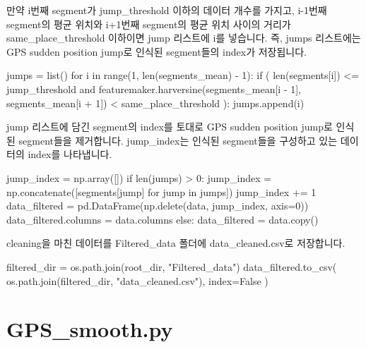 \documentclass{oblivoir}
\begin{document}
  만약 i번째 segment가 jump\_threshold 이하의 데이터 개수를 가지고, i-1번째 segment의 평균 위치와 i+1번째 segment의 평균 위치 사이의 거리가 same\_place\_threshold 이하이면 jump 리스트에 i를 넣습니다.
  즉, jumps 리스트에는 GPS sudden position jump로 인식된 segment들의 index가 저장됩니다.
  \begin{python}[label={GPS_clean_7}]
    jumps = list()
    for i in range(1, len(segments_mean) - 1):
        if (
            len(segments[i]) <= jump_threshold
            and featuremaker.harversine(segments_mean[i - 1], segments_mean[i + 1])
            < same_place_threshold
        ):
            jumps.append(i)
  \end{python}
  jump 리스트에 담긴 segment의 index를 토대로 GPS sudden position jump로 인식된 segment들을 제거합니다.
  jump\_index는 인식된 segment들을 구성하고 있는 데이터의 index를 나타냅니다.
  \begin{python}[label={GPS_clean_8}]
    jump_index = np.array([])
    if len(jumps) > 0:
        jump_index = np.concatenate([segments[jump] for jump in jumps])
        jump_index += 1
        data_filtered = pd.DataFrame(np.delete(data, jump_index, axis=0))
        data_filtered.columns = data.columns
    else:
        data_filtered = data.copy()
  \end{python}
  cleaning을 마친 데이터를 Filtered\_data 폴더에 data\_cleaned.csv로 저장합니다.
  \begin{python}[label={GPS_clean_9}]
    filtered_dir = os.path.join(root_dir, "Filtered_data")
    data_filtered.to_csv(
        os.path.join(filtered_dir, "data_cleaned.csv"), index=False
    )
  \end{python}

  \section{GPS\_smooth.py}
\end{document}
